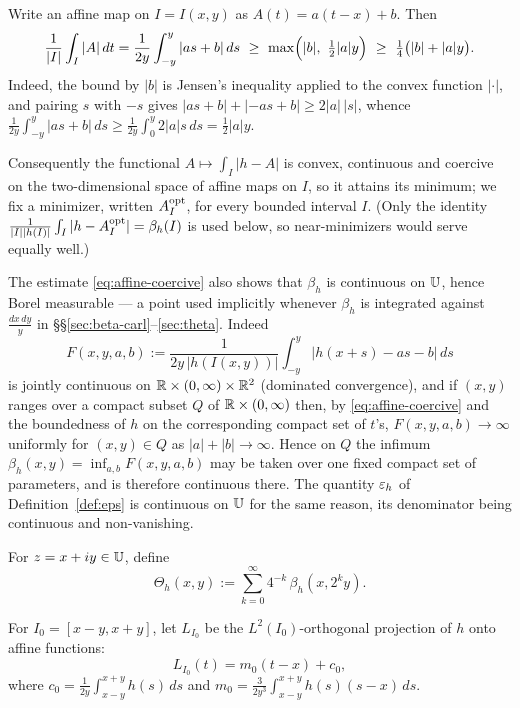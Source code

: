 \begin{remark}\label{rem:beta-attained}
	Write an affine map on $I=I(x,y)$ as $A(t)=a(t-x)+b$. Then
	\begin{equation}\label{eq:affine-coercive}
		\frac1{|I|}\int_I|A|\,dt=\frac1{2y}\int_{-y}^{y}|as+b|\,ds
		\ \ge\ \max\Bigl(|b|,\ \tfrac12|a|y\Bigr)\ \ge\ \tfrac14\bigl(|b|+|a|y\bigr) .
	\end{equation}
	Indeed, the bound by $|b|$ is Jensen's inequality applied to the convex
	function $|\cdot|$, and pairing $s$ with $-s$ gives
	$|as+b|+|{-as}+b|\ge2|a|\,|s|$, whence
	$\frac1{2y}\int_{-y}^{y}|as+b|\,ds\ge\frac1{2y}\int_0^{y}2|a|s\,ds=\frac12|a|y$.
	
	Consequently the functional $A\mapsto\int_I|h-A|$ is convex, continuous and
	coercive on the two-dimensional space of affine maps on $I$, so it attains its
	minimum; we fix a minimizer, written $A_I^{\rm opt}$, for every bounded
	interval $I$. (Only the identity
	$\frac1{|I||h(I)|}\int_I|h-A_I^{\rm opt}|=\beta_h(I)$ is used below, so
	near-minimizers would serve equally well.)
	
	The estimate \eqref{eq:affine-coercive} also shows that $\beta_h$ is continuous
	on $\mathbb{U}$, hence Borel measurable --- a point used implicitly whenever $\beta_h$
	is integrated against $\frac{dx\,dy}{y}$ in
	\S\S\ref{sec:beta-carl}--\ref{sec:theta}. Indeed
	\[
	F(x,y,a,b):=\frac1{2y\,|h(I(x,y))|}\int_{-y}^{y}\bigl|h(x+s)-as-b\bigr|\,ds
	\]
	is jointly continuous on $\mathbb{R}\times(0,\infty)\times\mathbb{R}^2$ (dominated
	convergence), and if $(x,y)$ ranges over a compact subset $Q$ of
	$\mathbb{R}\times(0,\infty)$ then, by \eqref{eq:affine-coercive} and the boundedness of
	$h$ on the corresponding compact set of $t$'s, $F(x,y,a,b)\to\infty$ uniformly
	for $(x,y)\in Q$ as $|a|+|b|\to\infty$. Hence on $Q$ the infimum
	$\beta_h(x,y)=\inf_{a,b}F(x,y,a,b)$ may be taken over one fixed compact set of
	parameters, and is therefore continuous there. The quantity $\varepsilon_h$ of
	Definition~\ref{def:eps} is continuous on $\mathbb{U}$ for the same reason, its
	denominator being continuous and non-vanishing.
\end{remark}

\begin{definition}\label{def:theta}
	\leanok
	For $z=x+iy\in\mathbb{U}$, define
	\[
	\Theta_h(x,y):=\sum_{k=0}^{\infty}4^{-k}\,\beta_h(x,2^k y).
	\]
\end{definition}

\begin{definition}\label{def:L2-proj}
	\leanok
	For $I_0=[x-y,x+y]$, let $L_{I_0}$ be the $L^2(I_0)$-orthogonal projection of $h$ onto affine functions:
	\[
	L_{I_0}(t)=m_0(t-x)+c_0,
	\]
	where $c_0=\frac1{2y}\int_{x-y}^{x+y}h(s)\,ds$ and $m_0=\frac{3}{2y^3}\int_{x-y}^{x+y}h(s)(s-x)\,ds$.
\end{definition}


